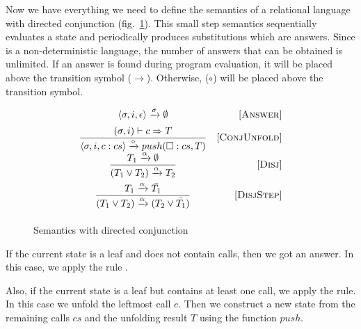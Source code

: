 
Now we have everything we need to define the semantics of a relational language with directed conjunction (fig.~\ref{fair:classic-semantics}). This small step semantics sequentially evaluates a state and periodically produces substitutions which are answers. Since \mk is a non-deterministic language, the number of answers that can be obtained is unlimited. If an answer is found during program evaluation, it will be placed above the transition symbol ($\xrightarrow{}$). Otherwise, ($\circ$) will be placed above the transition symbol.

\begin{figure}[h!]
\[\begin{array}{cr}

      {\langle \sigma, i, \epsilon \rangle \xrightarrow{\sigma} \emptyset}  
&     \mbox{[\textsc{Answer}]} \\[2mm]
\dfrac{(\sigma, i) \vdash c \Rightarrow T}
      {\langle \sigma, i, c : cs \rangle \xrightarrow{\circ} push(\Box : cs, T)}
&     \mbox{[\textsc{ConjUnfold}]} \\[2mm]
\dfrac{T_1 \xrightarrow{\alpha} \emptyset}
      {(T_1 \lor T_2) \xrightarrow{\alpha} T_2}
&     \mbox{[\textsc{Disj}]} \\[4mm]
\dfrac{T_1 \xrightarrow{\alpha} \bar{T_1}}
      {(T_1 \lor T_2) \xrightarrow{\alpha} (T_2 \lor\bar{T_1})}
&     \mbox{[\textsc{DisjStep}]} \\[4mm]
\end{array}\]
\caption{Semantics with directed conjunction}
\label{fair:classic-semantics}
\end{figure}

If the current state is a leaf and does not contain calls, then we got an answer. In this case, we apply the rule .

Also, if the current state is a leaf but contains at least one call, we apply the  rule. In this case we unfold the leftmost call $c$. Then we construct a new state from the remaining calls $cs$ and the unfolding result $T$ using the function $push$.

